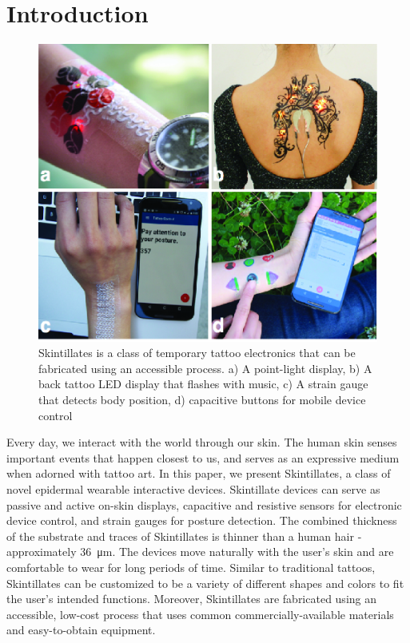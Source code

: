 \documentclass{sigchi}
\begin{document}
\section{Introduction}
\begin{figure}[!h]
\centering
\includegraphics[width=1\columnwidth]{figures/Figure1}
\caption{Skintillates is a class of temporary tattoo electronics that can be fabricated using an accessible process. a) A point-light display, b) A back tattoo LED display that flashes with music, c) A strain gauge that detects body position, d) capacitive buttons for mobile device control}
\vspace{-8pt}
\label{fig:overall}
\end{figure}
Every day, we interact with the world through our skin. The human skin senses important events that happen closest to us, and serves as an expressive medium when adorned with tattoo art. In this paper, we present Skintillates, a class of novel epidermal wearable interactive devices. Skintillate devices can serve as passive and active on-skin displays, capacitive and resistive sensors for electronic device control, and strain gauges for posture detection. The combined thickness of the substrate and traces of Skintillates is thinner than a human hair - approximately 36\SI{}{\micro\metre}. The devices move naturally with the user’s skin and are comfortable to wear for long periods of time. Similar to traditional tattoos, Skintillates can be customized to be a variety of different shapes and colors to fit the user's intended functions. Moreover, Skintillates are fabricated using an accessible, low-cost process that uses common commercially-available     materials     and      easy-to-obtain equipment. 
\end{document}
